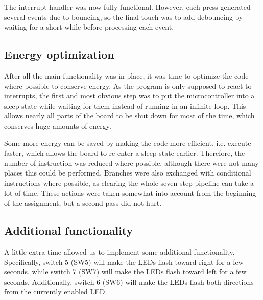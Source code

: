 The interrupt handler was now fully functional. However, each press generated several events due to bouncing, so the final touch was to add debouncing by waiting for a short while before processing each event.
\subsection{Energy optimization}

After all the main functionality was in place, it was time to optimize the code where possible to conserve energy. As the program is only supposed to react to interrupts, the first and most obvious step was to put the microcontroller into a sleep state while waiting for them instead of running in an infinite loop. This allows nearly all parts of the board to be shut down for most of the time, which conserves huge amounts of energy.

Some more energy can be saved by making the code more efficient, i.e. execute faster, which allows the board to re-enter a sleep state earlier. Therefore, the number of instruction was reduced where possible, although there were not many places this could be performed. Branches were also exchanged with conditional instructions where possible, as clearing the whole seven step pipeline can take a lot of time. These actions were taken somewhat into account from the beginning of the assignment, but a second pass did not hurt.
\subsection{Additional functionality}

A little extra time allowed us to implement some additional functionality. Specifically, switch 5 (SW5) will make the LEDs flash toward right for a few seconds, while switch 7 (SW7) will make the LEDs flash toward left for a few seconds. Additionally, switch 6 (SW6) will make the LEDs flash both directions from the currently enabled LED.
